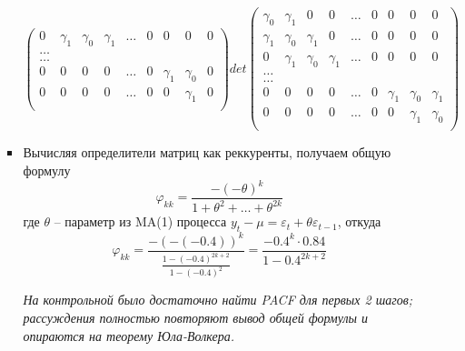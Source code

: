 \documentclass[10pt]{article}
\begin{document}
\begin{enumerate}
\begin{enumerate}
\begin{itemize}
\begin{center}
\begin{math}
{\begin{pmatrix}
                    0 & \gamma_1 & \gamma_0 & \gamma_1 & \hdots &  0 & 0 & 0 & 0\\
                    \hdots \\
                    \hdots \\
                    0 & 0 & 0 & 0 & \hdots & 0 & \gamma_1 & \gamma_0 & 0\\
                    0 & 0 & 0 & 0 & \hdots & 0 & 0 & \gamma_1 & 0\\
                \end{pmatrix}
                }
                {det
                \begin{pmatrix}
                    \gamma_0 & \gamma_1 & 0 & 0 & \hdots & 0 & 0 & 0 & 0 \\
                    \gamma_1 & \gamma_0 & \gamma_1 & 0 & \hdots & 0 & 0 & 0 & 0 \\
                    0 & \gamma_1 & \gamma_0 & \gamma_1 & \hdots &  0 & 0 & 0 & 0\\
                    \hdots \\
                    \hdots \\
                    0 & 0 & 0 & 0 & \hdots & 0 & \gamma_1 & \gamma_0 & \gamma_1 \\
                    0 & 0 & 0 & 0 & \hdots & 0 & 0 & \gamma_1 & \gamma_0 \\
                \end{pmatrix}
                }
            \end{math}
        \end{center}
        \item Вычисляя определители матриц как реккуренты, получаем общую формулу
        $$\varphi_{kk} = \frac{-(-\theta)^k}{1 + \theta^2 + \hdots + \theta^{2k}}$$
        где $\theta$ -- параметр из MA(1) процесса $y_t - \mu = \varepsilon_t + \theta \varepsilon_{t-1}$, откуда
        $$\varphi_{kk} = \frac{-(-(-0.4))^k}{\frac{1 - (-0.4)^{2k+2}}{1 - (-0.4)^2}} = \frac{-0.4^k\cdot 0.84}{1 - 0.4^{2k+2}}$$

        \textit{На контрольной было достаточно найти PACF для первых 2 шагов;
        рассуждения полностью повторяют вывод общей формулы и опираются на теорему Юла-Волкера.}


\end{itemize}
\end{enumerate}
\end{enumerate}
\end{document}
